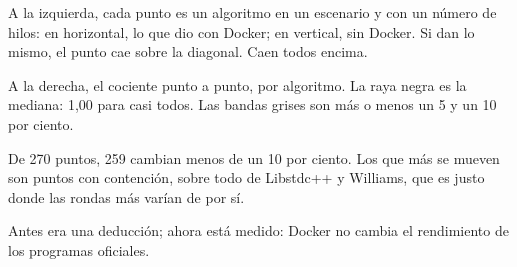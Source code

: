 A la izquierda, cada punto es un algoritmo en un escenario y con un número de hilos: en horizontal, lo que dio con Docker; en vertical, sin Docker. Si dan lo mismo, el punto cae sobre la diagonal. Caen todos encima.

A la derecha, el cociente punto a punto, por algoritmo. La raya negra es la mediana: 1,00 para casi todos. Las bandas grises son más o menos un 5 y un 10 por ciento.

De 270 puntos, 259 cambian menos de un 10 por ciento. Los que más se mueven son puntos con contención, sobre todo de Libstdc++ y Williams, que es justo donde las rondas más varían de por sí.

Antes era una deducción; ahora está medido: Docker no cambia el rendimiento de los programas oficiales.
